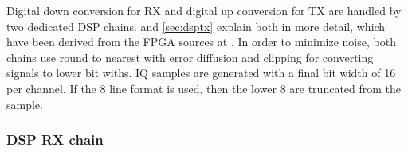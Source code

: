 \documentclass[12pt,a4paper,parskip=full]{scrartcl}
\begin{document}
Digital down conversion for RX and digital up conversion for TX are handled by two dedicated DSP chains.
 and \cref{sec:dsptx} explain both in more detail, which have been derived from the FPGA sources at \cite{usrp_src}.
In order to minimize noise, both chains use round to nearest with error diffusion and clipping
for converting signals to lower bit withs. IQ samples are generated with a final bit width of
\SI{16}{\bit} per channel. If the \SI{8}{\bit} line format is used, then the lower \SI{8}{\bit}
are truncated from the sample.
\subsubsection{DSP RX chain}
\label{sec:dsprx}
\begin{figure}[htb]
    \centering
{}
\end{figure}
\end{document}
